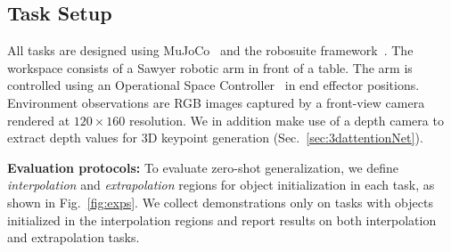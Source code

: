 \documentclass[letterpaper, 10 pt, conference]{ieeeconf}
\begin{document}
\subsection{Task Setup}
All tasks are designed using MuJoCo~\cite{todorov2012mujoco} and the robosuite framework~\cite{robosuite2020}. The workspace consists of a Sawyer robotic arm in front of a table. The arm is controlled using an Operational Space Controller~\cite{khatib1987unified} in end effector positions. 
Environment observations are RGB images captured by a front-view camera rendered at $120\times 160$ resolution. We in addition make use of a depth camera to extract depth values for 3D keypoint generation (Sec.~\ref{sec:3dattentionNet}).

\textbf{Evaluation protocols:} To evaluate zero-shot generalization, we define \emph{interpolation} and \emph{extrapolation} regions for object initialization in each task, as shown in Fig.~\ref{fig:exps}.
We collect demonstrations only on tasks with objects initialized in the interpolation regions and report results on both interpolation and extrapolation tasks.
\end{document}
